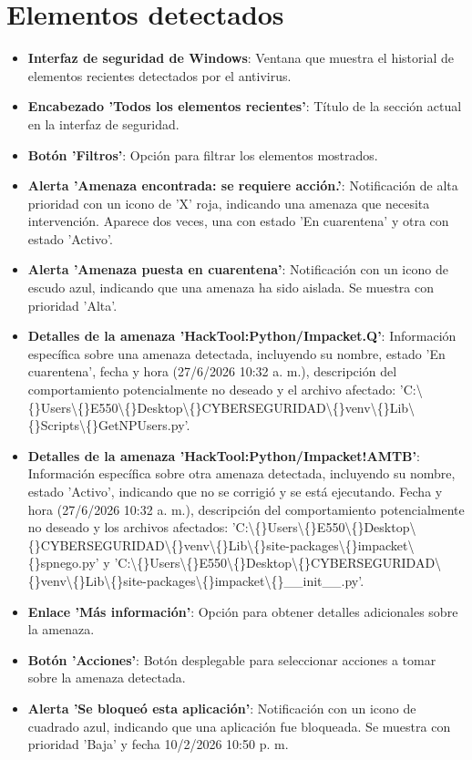 \documentclass[11pt,a4paper]{article}
\begin{document}
\section*{Elementos detectados}
\begin{itemize}[leftmargin=1.5em, itemsep=2pt]
  \item \textbf{Interfaz de seguridad de Windows}: Ventana que muestra el historial de elementos recientes detectados por el antivirus.
  \item \textbf{Encabezado 'Todos los elementos recientes'}: Título de la sección actual en la interfaz de seguridad.
  \item \textbf{Botón 'Filtros'}: Opción para filtrar los elementos mostrados.
  \item \textbf{Alerta 'Amenaza encontrada: se requiere acción.'}: Notificación de alta prioridad con un icono de 'X' roja, indicando una amenaza que necesita intervención. Aparece dos veces, una con estado 'En cuarentena' y otra con estado 'Activo'.
  \item \textbf{Alerta 'Amenaza puesta en cuarentena'}: Notificación con un icono de escudo azul, indicando que una amenaza ha sido aislada. Se muestra con prioridad 'Alta'.
  \item \textbf{Detalles de la amenaza 'HackTool:Python/Impacket.Q'}: Información específica sobre una amenaza detectada, incluyendo su nombre, estado 'En cuarentena', fecha y hora (27/6/2026 10:32 a. m.), descripción del comportamiento potencialmente no deseado y el archivo afectado: 'C:\textbackslash\{\}Users\textbackslash\{\}E550\textbackslash\{\}Desktop\textbackslash\{\}CYBERSEGURIDAD\textbackslash\{\}venv\textbackslash\{\}Lib\textbackslash\{\}Scripts\textbackslash\{\}GetNPUsers.py'.
  \item \textbf{Detalles de la amenaza 'HackTool:Python/Impacket!AMTB'}: Información específica sobre otra amenaza detectada, incluyendo su nombre, estado 'Activo', indicando que no se corrigió y se está ejecutando. Fecha y hora (27/6/2026 10:32 a. m.), descripción del comportamiento potencialmente no deseado y los archivos afectados: 'C:\textbackslash\{\}Users\textbackslash\{\}E550\textbackslash\{\}Desktop\textbackslash\{\}CYBERSEGURIDAD\textbackslash\{\}venv\textbackslash\{\}Lib\textbackslash\{\}site-packages\textbackslash\{\}impacket\textbackslash\{\}spnego.py' y 'C:\textbackslash\{\}Users\textbackslash\{\}E550\textbackslash\{\}Desktop\textbackslash\{\}CYBERSEGURIDAD\textbackslash\{\}venv\textbackslash\{\}Lib\textbackslash\{\}site-packages\textbackslash\{\}impacket\textbackslash\{\}\_\_init\_\_.py'.
  \item \textbf{Enlace 'Más información'}: Opción para obtener detalles adicionales sobre la amenaza.
  \item \textbf{Botón 'Acciones'}: Botón desplegable para seleccionar acciones a tomar sobre la amenaza detectada.
  \item \textbf{Alerta 'Se bloqueó esta aplicación'}: Notificación con un icono de cuadrado azul, indicando que una aplicación fue bloqueada. Se muestra con prioridad 'Baja' y fecha 10/2/2026 10:50 p. m.
\end{itemize}
\end{document}
